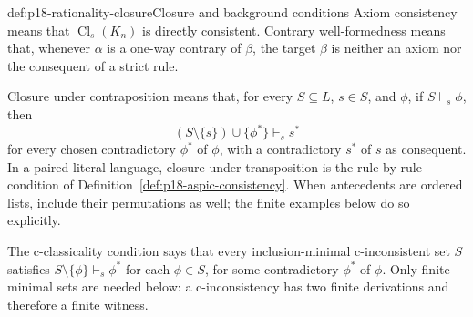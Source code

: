 \begin{hbdefinition}{def:p18-rationality-closure}{Closure and background conditions}
Axiom consistency means that \(\operatorname{Cl}_s(K_n)\) is directly
consistent. Contrary well-formedness means that, whenever \(\alpha\) is
a one-way contrary of \(\beta\), the target \(\beta\) is neither an axiom
nor the consequent of a strict rule.

Closure under contraposition means that, for every \(S\subseteq L\),
\(s\in S\), and \(\phi\), if \(S\vdash_s\phi\), then
\[
 (S\setminus\{s\})\cup\{\phi^\ast\}\vdash_s s^\ast
\]
for every chosen contradictory \(\phi^\ast\) of \(\phi\), with a
contradictory \(s^\ast\) of \(s\) as consequent.
In a paired-literal language, closure under transposition is the
rule-by-rule condition of Definition~\ref{def:p18-aspic-consistency}.
When antecedents are ordered lists, include their permutations as well;
the finite examples below do so explicitly.

The c-classicality condition says that every inclusion-minimal
c-inconsistent set \(S\) satisfies
\(S\setminus\{\phi\}\vdash_s\phi^\ast\) for each \(\phi\in S\),
for some contradictory \(\phi^\ast\) of \(\phi\).
Only finite minimal sets are needed below: a c-inconsistency has two
finite derivations and therefore a finite witness.
\end{hbdefinition}

